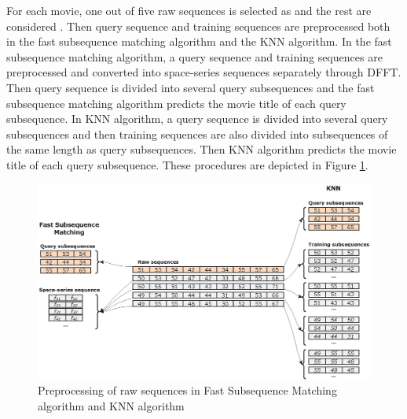 For each movie, one out of five raw sequences is selected as  and the rest are considered .
Then query sequence and training sequences are preprocessed both in the fast subsequence matching algorithm and the KNN algorithm. 
In the fast subsequence matching algorithm, a query sequence and training sequences are preprocessed and converted into space-series sequences separately through DFFT.
Then query sequence is divided into several query subsequences and the fast subsequence matching algorithm predicts the movie title of each query subsequence. 
In KNN algorithm, a query sequence is divided into several query subsequences and then training sequences are also divided into subsequences of the same length as query subsequences. 
Then KNN algorithm predicts the movie title of each query subsequence. 
These procedures are depicted in Figure \ref{fig:train_test_set}.

\begin{figure}[!h]
\centering
\includegraphics[scale=0.60]{Figures/TrainTestSet}
\caption{Preprocessing of raw sequences in Fast Subsequence Matching algorithm and KNN algorithm}
\label{fig:train_test_set}
\end{figure}






